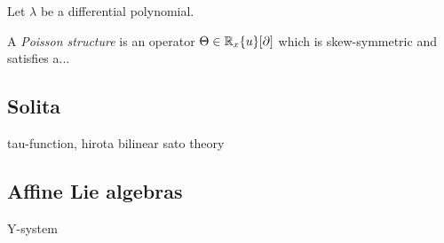 \documentclass{../../../small}
\begin{document}
\begin{prb}[Lagrangian]
Let $\lambda$ be a differential polynomial.
\end{prb}


\begin{prb}
A \emph{Poisson structure} is an operator $\Theta\in\mathbb{R}_x\{u\}[\partial]$ which is skew-symmetric and satisfies a...
\end{prb}


\subsection*{Solita}

tau-function, hirota bilinear
sato theory

\subsection*{Affine Lie algebras}
Y-system
\end{document}
